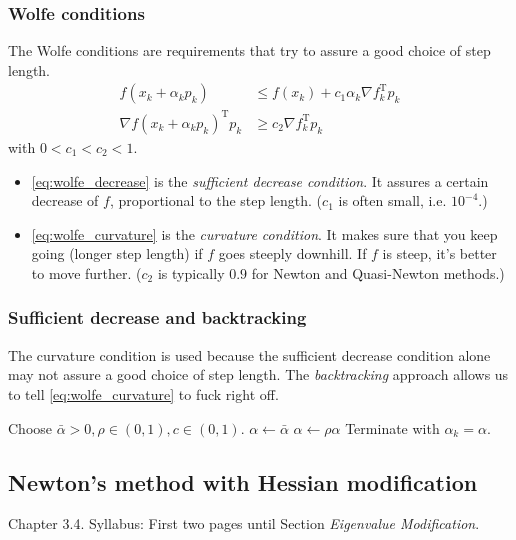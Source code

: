 \documentclass[a4paper, 12pt]{article}
\theoremstyle{definition}
\newcommand{\T}{^{\scriptscriptstyle \text{T}}}
\begin{document}
\subsubsection{Wolfe conditions}
The Wolfe conditions are requirements that try to assure a good choice of step length.
\begin{subequations}\label{eq:wolfe}
	\begin{align}
		f(x_k + \alpha_k p_k)              &\leq f(x_k) + c_1 \alpha_k \nabla f_k\T p_k \label{eq:wolfe_decrease} \\
		\nabla f(x_k + \alpha_k p_k)\T p_k &\geq c_2 \nabla f_k\T p_k                   \label{eq:wolfe_curvature}
	\end{align}
\end{subequations}
with \( 0 < c_1 < c_2 < 1 \).
\begin{itemize}
	\item \eqref{eq:wolfe_decrease} is the \emph{sufficient decrease condition}. It assures a certain decrease of \(f\), proportional to the step length. (\(c_1\) is often small, i.e. \( 10^{-4} \).)
	\item \eqref{eq:wolfe_curvature} is the \emph{curvature condition}. It makes sure that you keep going (longer step length) if \(f\) goes steeply downhill. If \(f\) is steep, it's better to move further. (\(c_2\) is typically \(0.9\) for Newton and Quasi-Newton methods.)
\end{itemize}

\subsubsection{Sufficient decrease and backtracking}
The curvature condition is used because the sufficient decrease condition alone may not assure a good choice of step length. The \emph{backtracking} approach allows us to tell \eqref{eq:wolfe_curvature} to fuck right off.

\begin{algorithmic}
	\State Choose \( \bar{\alpha} > 0, \rho \in (0, 1), c \in (0, 1) \).
	\State \( \alpha \gets \bar{\alpha} \)
	\Repeat
		\State \( \alpha \gets \rho \alpha \)
	\Until{\( f(x_k + \alpha p_k) \leq f(x_k) + c \alpha \nabla f_k\T p_k \)}
	\State Terminate with \( \alpha_k = \alpha \).
\end{algorithmic}

\subsection{Newton's method with Hessian modification}
Chapter 3.4. Syllabus: First two pages until Section \emph{Eigenvalue Modification}.
\end{document}
